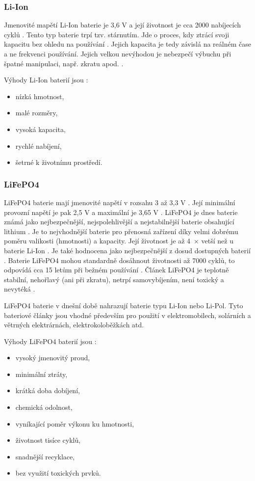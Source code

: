 \subsubsection{Li-Ion}
Jmenovité mapětí Li-Ion baterie je 3,6 V a její životnost je cca 2000 nabíjecích cyklů \cite{Li-Ion}. Tento typ baterie trpí tzv. stárnutím. Jde o proces, kdy ztrácí 
svoji kapacitu bez ohledu na používání \cite{Li-Ion}. Jejich kapacita je tedy závislá na reálném čase a ne frekvenci používání. Jejich velkou nevýhodou je nebezpečí 
výbuchu při špatné manipulaci, např. zkratu apod. \cite{Li-Ion}. 

Výhody Li-Ion baterií jsou \cite{Li-Ion}:
\begin{itemize}
  \item nízká hmotnost,
  \item malé rozměry,
  \item vysoká kapacita,
  \item rychlé nabíjení,
  \item šetrné k životnímu prostředí. 
\end{itemize}

\subsubsection{LiFePO4}
LiFePO4 baterie mají jmenovité napětí v rozsahu 3 až 3,3 V \cite{LiFePO4_malina}. Její minimální provozní napětí je pak 2,5 V a maximální je 3,65 V \cite{LiFePO4_malina}.
LiFePO4 je dnes baterie známá jako nejbezpečnější, nejspolehlivější a nejstabilnější baterie obsahující lithium \cite{LiFePO4_malina}. Je to nejvhodnější baterie pro 
přenosná zařízení díky velmi dobrému poměru valikosti (hmotnosti) a kapacity. Její životnost je až 4~$\times$ vetší než u baterie Li-Ion \cite{LiFePO4_malina}. Je také hodnocena
jako nejbezpečnější z dosud dostupných baterií \cite{LiFePO4_malina}. Baterie LiFePO4 mohou standardně dosáhnout životnosti až 7000 cyklů, to odpovídá cca 15 letům při bežném
používání \cite{LiFePO4_malina}. Článek LiFePO4 je teplotně stabilní, nehořlavý (ani při zkratu), netrpí samovybíjením, není toxický a nevytéká \cite{LiFePO4_malina}.

LiFePO4 baterie v dnešní době nahrazují baterie typu Li-Ion nebo Li-Pol.
Tyto bateriové články jsou vhodné především pro použití v elektromobilech, solárních a větrných elektrárnách, elektrokoloběžkách atd. 

Výhody LiFePO4 baterií jsou \cite{LiFePO4_smart}:
\begin{itemize}
  \item vysoký jmenovitý proud,
  \item minimální ztráty,
  \item krátká doba dobíjení,
  \item chemická odolnost,
  \item vyníkající poměr výkonu ku hmotnosti,
  \item životnost tisíce cyklů,
  \item snadnější recyklace,
  \item bez využití toxických prvků.
\end{itemize}

